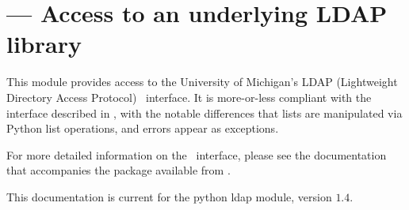 

\section{ --- 
	Access to an underlying LDAP library}


This module provides access to the University of Michigan's LDAP 
(Lightweight Directory Access Protocol) \C\ interface. 
It is more-or-less compliant with the interface described in ,
with the notable differences that lists are manipulated via Python
list operations, and errors appear as exceptions.

For more detailed information on the \C\ interface, 
please see the documentation that accompanies the package available from
.

This documentation is current for the python ldap module, version
$1.4$.







